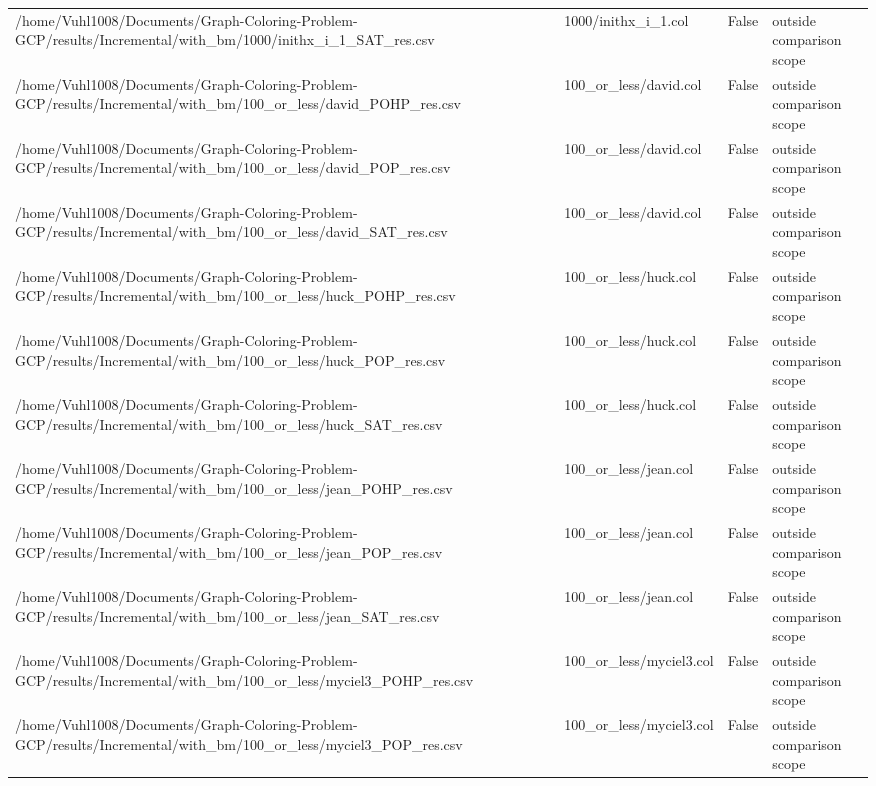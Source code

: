 \begin{table}[htbp]
\begin{tabular}{llll}
/home/Vuhl1008/Documents/Graph-Coloring-Problem-GCP/results/Incremental/with\_bm/1000/inithx\_i\_1\_SAT\_res.csv & 1000/inithx\_i\_1.col & False & outside comparison scope \\
/home/Vuhl1008/Documents/Graph-Coloring-Problem-GCP/results/Incremental/with\_bm/100\_or\_less/david\_POHP\_res.csv & 100\_or\_less/david.col & False & outside comparison scope \\
/home/Vuhl1008/Documents/Graph-Coloring-Problem-GCP/results/Incremental/with\_bm/100\_or\_less/david\_POP\_res.csv & 100\_or\_less/david.col & False & outside comparison scope \\
/home/Vuhl1008/Documents/Graph-Coloring-Problem-GCP/results/Incremental/with\_bm/100\_or\_less/david\_SAT\_res.csv & 100\_or\_less/david.col & False & outside comparison scope \\
/home/Vuhl1008/Documents/Graph-Coloring-Problem-GCP/results/Incremental/with\_bm/100\_or\_less/huck\_POHP\_res.csv & 100\_or\_less/huck.col & False & outside comparison scope \\
/home/Vuhl1008/Documents/Graph-Coloring-Problem-GCP/results/Incremental/with\_bm/100\_or\_less/huck\_POP\_res.csv & 100\_or\_less/huck.col & False & outside comparison scope \\
/home/Vuhl1008/Documents/Graph-Coloring-Problem-GCP/results/Incremental/with\_bm/100\_or\_less/huck\_SAT\_res.csv & 100\_or\_less/huck.col & False & outside comparison scope \\
/home/Vuhl1008/Documents/Graph-Coloring-Problem-GCP/results/Incremental/with\_bm/100\_or\_less/jean\_POHP\_res.csv & 100\_or\_less/jean.col & False & outside comparison scope \\
/home/Vuhl1008/Documents/Graph-Coloring-Problem-GCP/results/Incremental/with\_bm/100\_or\_less/jean\_POP\_res.csv & 100\_or\_less/jean.col & False & outside comparison scope \\
/home/Vuhl1008/Documents/Graph-Coloring-Problem-GCP/results/Incremental/with\_bm/100\_or\_less/jean\_SAT\_res.csv & 100\_or\_less/jean.col & False & outside comparison scope \\
/home/Vuhl1008/Documents/Graph-Coloring-Problem-GCP/results/Incremental/with\_bm/100\_or\_less/myciel3\_POHP\_res.csv & 100\_or\_less/myciel3.col & False & outside comparison scope \\
/home/Vuhl1008/Documents/Graph-Coloring-Problem-GCP/results/Incremental/with\_bm/100\_or\_less/myciel3\_POP\_res.csv & 100\_or\_less/myciel3.col & False & outside comparison scope \\

\end{tabular}
\end{table}
